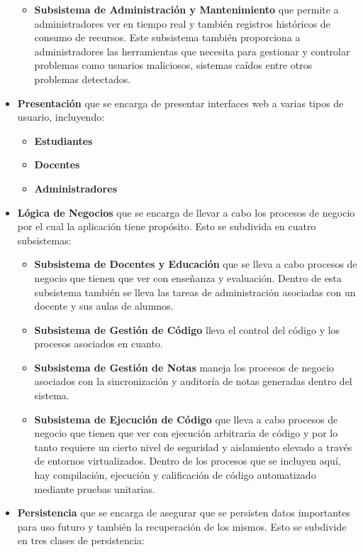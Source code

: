 \begin{itemize}
\begin{itemize}
        \item \textbf{Subsistema de Administración y Mantenimiento} que permite a administradores ver en tiempo real y también registros históricos de consumo de recursos. Este subsistema también proporciona a administradores las herramientas que necesita para gestionar y controlar problemas como usuarios maliciosos, sistemas caídos entre otros problemas detectados.
    \end{itemize}
    \item \textbf{Presentación} que se encarga de presentar interfaces web a varias tipos de usuario, incluyendo:
    \begin{itemize}
    	\item \textbf{Estudiantes}
		\item \textbf{Docentes}
		\item \textbf{Administradores}
    \end{itemize}
    \item \textbf{Lógica de Negocios} que se encarga de llevar a cabo los procesos de negocio por el cual la aplicación tiene propósito. Esto se subdivida en cuatro subsistemas:
    \begin{itemize}
    	\item \textbf{Subsistema de Docentes y Educación} que se lleva a cabo procesos de negocio que tienen que ver con enseñanza y evaluación. Dentro de esta subsistema también se lleva las tareas de administración asociadas con un docente y sus aulas de alumnos.
        \item \textbf{Subsistema de Gestión de Código} lleva el control del código y los procesos asociados en cuanto. 
        \item \textbf{Subsistema de Gestión de Notas} maneja los procesos de negocio asociados con la sincronización y auditoría de notas generadas dentro del sistema. 
        \item \textbf{Subsistema de Ejecución de Código} que lleva a cabo procesos de negocio que tienen que ver con ejecución arbitraria de código y por lo tanto requiere un cierto nivel de seguridad y aislamiento elevado a través de entornos virtualizados. Dentro de los procesos que se incluyen aquí, hay compilación, ejecución y calificación de código automatizado mediante pruebas unitarias.  
    \end{itemize}
    \item \textbf{Persistencia} que se encarga de asegurar que se persisten datos importantes para uso futuro y también la recuperación de los mismos. Esto se subdivide en tres clases de persistencia:

\end{itemize}
